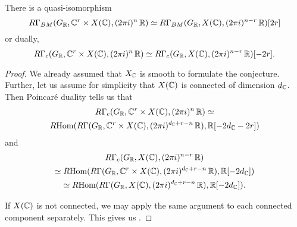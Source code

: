 \begin{lemma}
  There is a quasi-isomorphism
  \[ R\Gamma_{BM} (G_{\mathbb{R}}, \mathbb{C}^r\times X (\mathbb{C}), (2\pi i)^n\,\mathbb{R}) \simeq
    R\Gamma_{BM} (G_{\mathbb{R}}, X (\mathbb{C}), (2\pi i)^{n-r}\,\mathbb{R}) [2r] \]
  or dually,
  \begin{equation}
    \label{eqn:affine-space-over-X-quiso-of-RGammac}
    R\Gamma_c (G_{\mathbb{R}}, \mathbb{C}^r \times X (\mathbb{C}), (2\pi i)^n\,\mathbb{R}) \simeq
    R\Gamma_c (G_{\mathbb{R}}, X (\mathbb{C}), (2\pi i)^{n-r}\,\mathbb{R}) [-2r].
  \end{equation}

  \begin{proof}
    We already assumed that $X_{\mathbb{C}}$ is smooth to formulate the
    conjecture. Further, let us assume for simplicity that $X (\mathbb{C})$ is
    connected of dimension $d_{\mathbb{C}}$. Then Poincaré duality tells us that
    \begin{multline*}
      R\Gamma_c (G_{\mathbb{R}}, \mathbb{C}^r \times X (\mathbb{C}), (2\pi i)^n\,\mathbb{R}) \simeq \\
      R\!\operatorname{Hom} (R\Gamma (G_{\mathbb{R}}, \mathbb{C}^r\times X (\mathbb{C}), (2\pi i)^{d_{\mathbb{C}}+r-n}\,\mathbb{R}), \mathbb{R} [-2d_{\mathbb{C}} - 2r])
    \end{multline*}
    and
    \begin{multline*}
      R\Gamma_c (G_{\mathbb{R}}, X (\mathbb{C}), (2\pi i)^{n-r}\,\mathbb{R}) \\
      \simeq R\!\operatorname{Hom} (R\Gamma (G_{\mathbb{R}}, \mathbb{C}^r\times X (\mathbb{C}), (2\pi i)^{d_{\mathbb{C}}+r-n}\,\mathbb{R}), \mathbb{R} [-2d_{\mathbb{C}}]) \\
      \simeq R\!\operatorname{Hom} (R\Gamma (G_{\mathbb{R}}, X (\mathbb{C}), (2\pi i)^{d_{\mathbb{C}}+r-n}\,\mathbb{R}), \mathbb{R} [-2d_{\mathbb{C}}]).
    \end{multline*}

    If $X (\mathbb{C})$ is not connected, we may apply the same argument to each
    connected component separately. This gives us
    .
  \end{proof}
\end{lemma}

